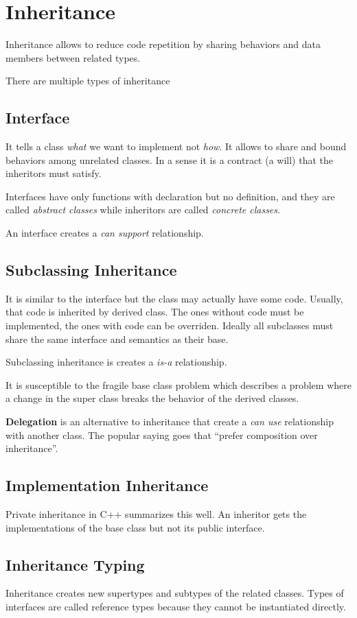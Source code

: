 \section{Inheritance}
Inheritance allows to reduce code repetition by sharing behaviors and
data members between related types.

There are multiple types of inheritance

\subsection*{Interface}
It tells a class \textit{what} we want to implement not \textit{how}. It
allows to share and bound behaviors among unrelated classes. In a sense
it is a contract (a will) that the inheritors must satisfy.

Interfaces have only functions with declaration but no definition, and
they are called \textit{abstract classes} while inheritors are called
\textit{concrete classes}.

An interface creates a \textit{can support} relationship.

\subsection*{Subclassing Inheritance}
It is similar to the interface but the class may actually have some
code. Usually, that code is inherited by derived class. The ones without
code must be implemented, the ones with code can be overriden. Ideally
all subclasses must share the same interface and semantics as their
base.

Subclassing inheritance is creates a \textit{is-a} relationship.

It is susceptible to the fragile base class problem which describes a
problem where a change in the super class breaks the behavior of the
derived classes.

\textbf{Delegation} is an alternative to inheritance that create a
\textit{can use} relationship with another class. The popular saying
goes that ``prefer composition over inheritance''.

\subsection*{Implementation Inheritance}
Private inheritance in C++ summarizes this well. An inheritor gets the
implementations of the base class but not its public interface.

\subsection*{Inheritance Typing}
Inheritance creates new supertypes and subtypes of the related classes.
Types of interfaces are called reference types because they cannot be
instantiated directly.

